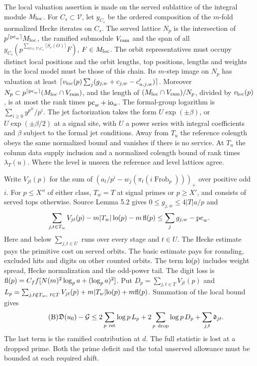 \documentclass[letterpaper,11pt]{article}
\newcommand{\Frob}{\operatorname{Frob}}
\newcommand{\Dsum}{\mathfrak D}
\newcommand{\Gain}{\mathcal G}
\begin{document}
The local valuation assertion is made on the served sublattice of the integral module \(M_{\rm loc}\). For \(C_s\subset\mathcal V\), let \(y_{C_s}\) be the ordered composition of the \(m\)-fold normalized Hecke iterates on \(C_s\). The served lattice \(N_p\) is the intersection of \(p^{\lceil{\rm pc}_w\rceil}M_{\rm loc}\), the ramified submodule \(V_{\rm ram}\) and the span of all
\(y_{C_s}(p^{\sum_{O\in\mathcal V\setminus C_s}\lceil S_v(O)\rceil}F)\), \(F\in M_{\rm loc}\).
The orbit representatives must occupy distinct local positions and the orbit lengths, top positions, lengths and weights in the local model must be those of this chain. Its \(m\)-step image on \(N_p\) has valuation at least
\(\lceil v_{\rm loc}(p)\sum_j(g_{j,w}+c_{j,w}-c'_{u,j,w})\rceil\).
Moreover \(N_p\subset p^{\lceil{\rm pc}_w\rceil}(M_{\rm loc}\cap V_{\rm ram})\), and the length of \((M_{\rm loc}\cap V_{\rm ram})/N_p\), divided by \(v_{\rm loc}(p)\), is at most the rank times \({\rm pc}_w+{\rm io}_w\).
The formal-group logarithm is \(\sum_{i\ge0}y^{p^{2i}}/p^i\). The jet factorization takes the form \(U\exp(\pm\beta)\), or \(U\exp(\pm\beta/2)\) at a signal site, with \(U\) a power series with integral coefficients and \(\beta\) subject to the formal jet conditions. Away from \(T_u\) the reference colength obeys the same normalized bound and vanishes if there is no service. At \(T_u\) the column data supply inclusion and a normalized colength bound of rank times \(\lambda_T(u)\). Where the level is unseen the reference and level lattices agree.

Write \(V_{jt}(p)\) for the sum of \((a_t/p^i-w_j(\pi_t(i\Frob_p)))_+\) over positive odd \(i\). For \(p\le X''\) of either class, \(T_w=T\) at signal primes or \(p\ge X'\), and consists of served tops otherwise. Source Lemma 5.2 gives \(0\le g_{j,w}\le4|T|a/p\) and
\[
 \sum_{j,t\in T_w} V_{jt}(p)-m|T_w|\,{\rm lo}(p)-m\,{\rm fl}(p)
 \le\sum_jg_{j,w}-{\rm pc}_w .
\]
Here and below \(\sum_{j,t\in U}\) runs over every stage and \(t\in U\). The Hecke estimate pays the primitive cost on served orbits. The basic estimate pays for rounding, excluded hits and digits on other counted orbits. The term \({\rm lo}(p)\) includes weight spread, Hecke normalization and the odd-power tail. The digit loss is \({\rm fl}(p)=C_f f[N(m)^2\log_p a+(\log_p a)^2]\). Put \(D_p=\sum_{j,t\in T}V_{jt}(p)\) and \(L_p=\sum_{j,t\notin T_w,\ t\in T}V_{jt}(p)+m|T_w|{\rm lo}(p)+m{\rm fl}(p)\). Summation of the local bound gives
\begin{equation}\tag{B}\label{eq:B}
 \Dsum(u_0)-\Gain\le 2\sum_{p\ {\rm ret}}\log p\,L_p+
 2\sum_{p\ {\rm drop}}\log p\,D_p+\sum_{j,t}\mathfrak d_{jt}.
\end{equation}
The last term is the ramified contribution at \(d\). The full statistic is lost at a dropped prime. Both the prime deficit and the total unserved allowance must be bounded at each required shift.
\end{document}
